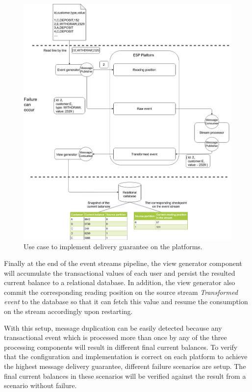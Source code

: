 \begin{figure}
\begin{adjustwidth}{-1cm}{}
	\centering
	\includegraphics[width=18cm,height=\textheight]{images/implementation-use-case-1.png}
	\caption{Use case to implement delivery guarantee on the platforms.}
	\label{fig:impusecase}
\end{adjustwidth}
\end{figure}


Finally at the end of the event streams pipeline, the view generator component will accumulate the transactional values of each user and persist the resulted current balance to a relational database. In addition, the view generator also commit the corresponding reading position on the source stream \emph{Transformed event} to the database so that it can fetch this value and resume the consumption on the stream accordingly upon restarting.


With this setup, message duplication can be easily detected because any transactional event which is processed more than once by any of the three processing components will result in different final current balances. To verify that the configuration and implementation is correct on each platform to achieve the highest message delivery guarantee, different failure scenarios are setup. The final current balances in these scenarios will be verified against the result from a scenario without failure.


